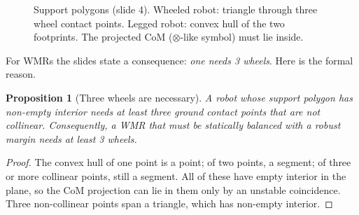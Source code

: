 \documentclass[11pt,a4paper]{article}
\newcommand{\com}[1]{\begin{scope}[shift={(#1)}]\draw[fill=white,thick] (0,0) circle (0.13);
  \fill (0,0) -- (0.13,0) arc (0:90:0.13) -- cycle;
  \fill (0,0) -- (-0.13,0) arc (180:270:0.13) -- cycle;\end{scope}}
\theoremstyle{definition}
\theoremstyle{plain}
\newtheorem{proposition}[definition]{Proposition}
\theoremstyle{remark}
\begin{document}
\begin{figure}[H]
\centering
{}
\caption{Support polygons (slide 4). Wheeled robot: triangle through three wheel contact points. Legged robot: convex hull of the two footprints. The projected CoM ($\otimes$-like symbol) must lie inside.}
\end{figure}

For WMRs the slides state a consequence: \emph{one needs 3 wheels}. Here is the formal reason.

\begin{proposition}[Three wheels are necessary]\label{prop:three}
A robot whose support polygon has non-empty interior needs at least three ground contact points that are not collinear. Consequently, a WMR that must be statically balanced with a robust margin needs at least 3 wheels.
\end{proposition}
\begin{proof}
The convex hull of one point is a point; of two points, a segment; of three or more collinear points, still a segment. All of these have empty interior in the plane, so the CoM projection can lie in them only by an unstable coincidence. Three non-collinear points span a triangle, which has non-empty interior.
\end{proof}
\end{document}
